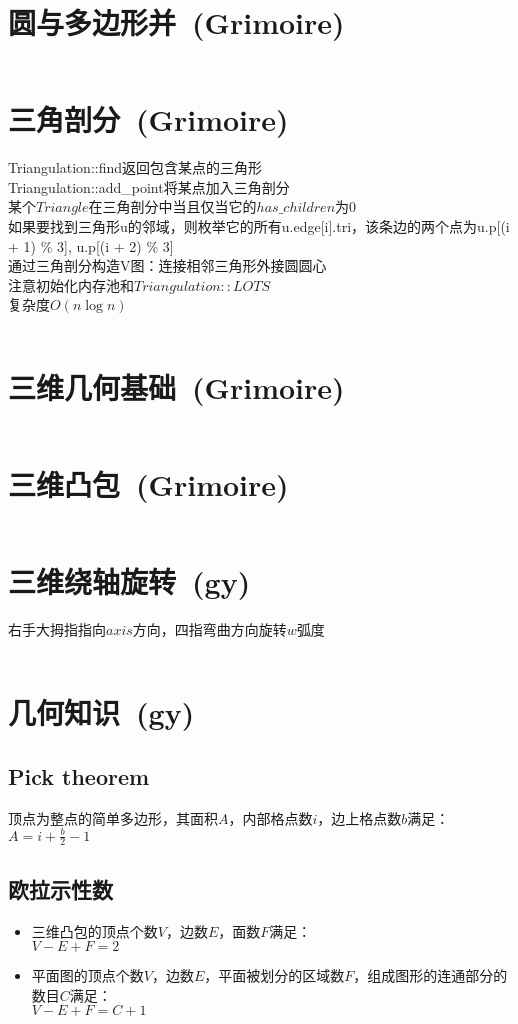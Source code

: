 \section{圆与多边形并\ \small(Grimoire)}
	\inputminted{cpp}{geometry/area_union.cpp}
\section{三角剖分\ \small(Grimoire)}
	Triangulation::find返回包含某点的三角形
	\\Triangulation::add\_point将某点加入三角剖分
	\\某个$ Triangle $在三角剖分中当且仅当它的$ has\_children $为$ 0 $
	\\如果要找到三角形u的邻域，则枚举它的所有u.edge[i].tri，该条边的两个点为u.p[(i + 1) \% 3], u.p[(i + 2) \% 3]
	\\通过三角剖分构造V图：连接相邻三角形外接圆圆心
	\\注意初始化内存池和$ Triangulation::LOTS $
	\\复杂度$ O(n \log n) $
	\inputminted{cpp}{geometry/delaunay_triangulation.cpp}
\section{三维几何基础\ \small(Grimoire)}
	\inputminted{cpp}{geometry/3d_basic.cpp}
\section{三维凸包\ \small(Grimoire)}
	\inputminted{cpp}{geometry/3d_convex.cpp}
\section{三维绕轴旋转\ \small(gy)}
	右手大拇指指向$ axis $方向，四指弯曲方向旋转$ w $弧度
	\inputminted{cpp}{geometry/3d_rotate.cpp}
\section{几何知识\ \small(gy)}
	\subsection*{Pick theorem}
		顶点为整点的简单多边形，其面积$ A $，内部格点数$ i $，边上格点数$ b $满足：
		\\$ A = i + \frac{b}{2} - 1 $
	\subsection*{欧拉示性数}
		\begin{itemize}
			\item 三维凸包的顶点个数$ V $，边数$ E $，面数$ F $满足：
			\\$ V - E + F = 2 $
			\item 平面图的顶点个数$ V $，边数$ E $，平面被划分的区域数$ F $，组成图形的连通部分的数目$ C $满足：
			\\$ V - E + F = C + 1 $
		\end{itemize}
